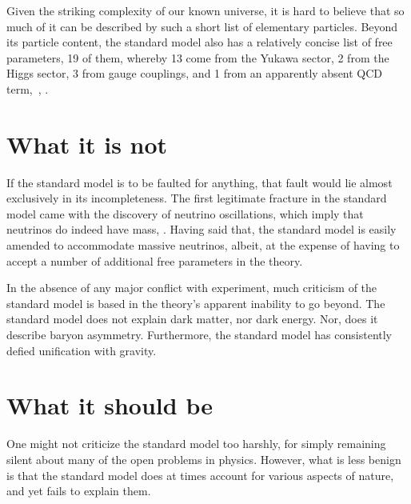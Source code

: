 \documentclass[letterpaper,12pt,titlepage,oneside,final]{book}
\begin{document}


Given the striking complexity of our known universe, it is hard to believe that so much of it can be described by such a short list of elementary particles.  Beyond its particle content, the standard model also has a relatively concise list of free parameters, 19 of them, whereby 13 come from the Yukawa sector, 2 from the Higgs sector, 3 from gauge couplings, and 1 from an apparently absent QCD term,~\cite{Mann}, \cite{Robinson}.  

\section{What it is not  }

If the standard model is to be faulted for anything, that fault would lie almost exclusively in its incompleteness.  The first  legitimate fracture in the standard model came with the discovery of neutrino oscillations, which imply that neutrinos do indeed have mass, \cite{Mann}.  Having said that, the standard model is easily amended to accommodate massive neutrinos, albeit, at the expense of having to accept a number of additional free parameters in the theory.  


In the absence of any major conflict with experiment, much criticism of the standard model is based in the theory's apparent inability to go beyond.  The standard model does not explain  dark matter, nor dark energy.  Nor, does it describe baryon asymmetry.  Furthermore, the standard model has consistently defied unification with gravity.  


\section{What it should be  }


One might not criticize the standard model too harshly, for simply remaining silent about many of the open problems in physics.  However, what is less benign is that the standard model does at times account for various aspects of nature, and yet fails to explain them.
\end{document}
